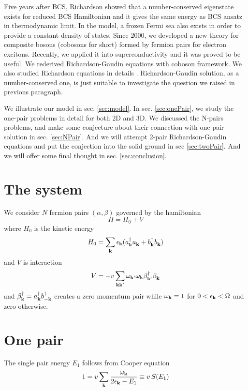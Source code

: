 \documentclass{article}
\begin{document}
Five years after BCS, Richardson showed that a number-conserved eigenstate exists for reduced BCS Hamiltonian and it gives the same energy as BCS ansatz in thermodynamic limit\cite{Richardson1,Richardson2,Richardson3,Richardson1968,gaudin}.  In the model, a frozen Fermi sea also exists in order to provide a constant density of states.  Since 2000, we developed a new theory for composite bosons (cobosons for short) formed by fermion pairs\cite{CobosonPhysicsReports} for electron excitons.   Recently, we applied it into superconductivity and it was proved to be useful.  We rederived Richardson-Gaudin equations with coboson framework\cite{CobosonBcsRich}. We also studied Richardson equations in details \cite{CombescotCooper,combescotBCS}.  Richardson-Gaudin solution, as a number-conserved one, is just suitable to investigate the question we raised in previous paragraph.  

We illustrate our model in sec. \ref{sec:model}.  In sec. \ref{sec:onePair}, we study the one-pair problems in detail for both 2D and 3D.  We discussed the N-pairs problems, and make some conjecture about their connection with one-pair solution  in sec. \ref{sec:NPair}.  And we will attempt 2-pair Richardson-Gaudin equations and put the conjection into the solid ground in sec \ref{sec:twoPair}.  And we will offer some final thought in sec. \ref{sec:conclusion}.
\section{The system\label{sec:model}}
We consider $N$ fermion pairs $(\alpha,\beta)$ governed by the hamiltonian
\begin{equation}
H=H_{0}+V
\end{equation}
where $H_0$ is the kinetic energy 
\begin{equation}
H_0=\sum_{\mathbf{k}}\epsilon_{\mathbf{k}}(a^\dagger_{\mathbf{k}}{}a^{}_{\mathbf{k}}+b^\dagger_{\mathbf{k}}{}b^{}_{\mathbf{k}})
\label{eq:}
\end{equation}
and $V$ is interaction
\begin{equation}
V=-v\sum_{\mathbf{k}\mathbf{k}'}\omega_{\mathbf{k}'}\omega_{\mathbf{k}}\beta^\dagger_{\mathbf{k}'}{}\beta^{}_{\mathbf{k}}
\label{eq:VBcs}
\end{equation}
and $\beta^\dagger_{\mathbf{k}}=a^\dagger_{\mathbf{k}}b^\dagger_{-\mathbf{k}}$ creates a zero momentum pair while $\omega_{\mathbf{k}}=1$ for $0<\epsilon_{\mathbf{k}}<\Omega$ and zero otherwise.  
\section{One pair\label{sec:onePair}}
The single pair energy $E_1$ follows from Cooper equation
\begin{equation}
1=v\sum_{\mathbf{k}}\frac{\omega_{\mathbf{k}}}{2\epsilon_{\mathbf{k}}-E_1}\equiv{}v\,S(E_1)
\label{eq:}
\end{equation}
\end{document}
